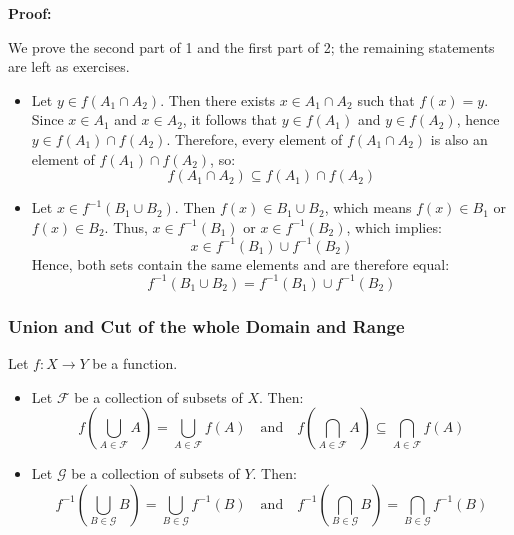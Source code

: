 \textbf{Proof:}

We prove the second part of 1 and the first part of 2; the 
remaining statements are left as exercises.

\begin{itemize}[label=\(-\)]
	
	\item  Let \( y \in f(A_1 \cap A_2) \). Then there exists \( x \in A_1 \cap A_2 \) such that 
	\( f(x) = y \). Since \( x \in A_1 \) and \( x \in A_2 \), it follows that \( y \in f(A_1) \) 
	and \( y \in f(A_2) \), hence \( y \in f(A_1) \cap f(A_2) \). Therefore, every element of \( f(A_1 \cap A_2) \) 
	is also an element of \( f(A_1) \cap f(A_2) \), so:
	      \[
		      f(A_1 \cap A_2) \subseteq f(A_1) \cap f(A_2)
	      \]

	\item Let \( x \in f^{-1} (B_1 \cup B_2) \). Then \( f(x) \in B_1 \cup B_2 \), which means \( f(x) \in B_1 \) 
	or \( f(x) \in B_2 \). Thus, \( x \in f^{-1}(B_1) \) 
	or \( x \in f^{-1}(B_2) \), which implies:
	      \[
		      x \in f^{-1}(B_1) \cup f^{-1}(B_2)
	      \]
	      Hence, both sets contain the same elements and are therefore equal:
	      \[
		      f^{-1}(B_1 \cup B_2) = f^{-1}(B_1) \cup f^{-1}(B_2)
	      \]
\end{itemize}

\subsubsection{Union and Cut of the whole Domain and Range}

Let \( f : X \to Y \) be a function.
\begin{itemize}[label =\(-\)]
	\item Let \( \mathcal{F} \) be a collection of subsets of \( X \). Then:
	      \[
		      f\left( \bigcup_{A \in \mathcal{F}} A \right) = \bigcup_{A \in \mathcal{F}} f(A)
		      \quad \text{and} \quad
		      f\left( \bigcap_{A \in \mathcal{F}} A \right) \subseteq \bigcap_{A \in \mathcal{F}} f(A)
	      \]

	\item Let \( \mathcal{G} \) be a collection of subsets of \( Y \). Then:
	      \[
		      f^{-1}\left( \bigcup_{B \in \mathcal{G}} B \right) = \bigcup_{B \in \mathcal{G}} f^{-1}(B)
		      \quad \text{and} \quad
		      f^{-1}\left( \bigcap_{B \in \mathcal{G}} B \right) = \bigcap_{B \in \mathcal{G}} f^{-1}(B)
	      \]
\end{itemize}

